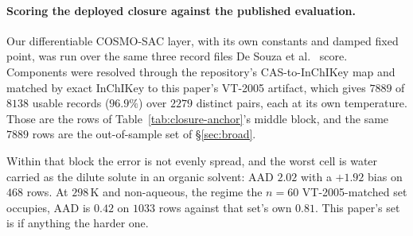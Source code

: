 \paragraph{Scoring the deployed closure against the published evaluation.} Our differentiable
COSMO-SAC layer, with its own constants and damped fixed point, was run over the same three record
files De Souza et al.\ \cite{desouza2025cosmosac} score. Components were resolved through the
repository's CAS-to-InChIKey map and matched by exact InChIKey to this paper's VT-2005 artifact,
which gives $7889$ of $8138$ usable records ($96.9\%$) over $2279$ distinct pairs, each at its own
temperature. Those are the rows of Table~\ref{tab:closure-anchor}'s middle block, and the same $7889$
rows are the out-of-sample set of \S\ref{sec:broad}.

Within that block the error is not evenly spread, and the worst cell is water carried as the dilute
solute in an organic solvent: AAD $2.02$ with a $+1.92$ bias on $468$ rows. At $298$\,K and non-aqueous, the regime the $n{=}60$ VT-2005-matched set occupies, AAD is $0.42$
on $1033$ rows against that set's own $0.81$. This paper's set is if anything the harder one.

